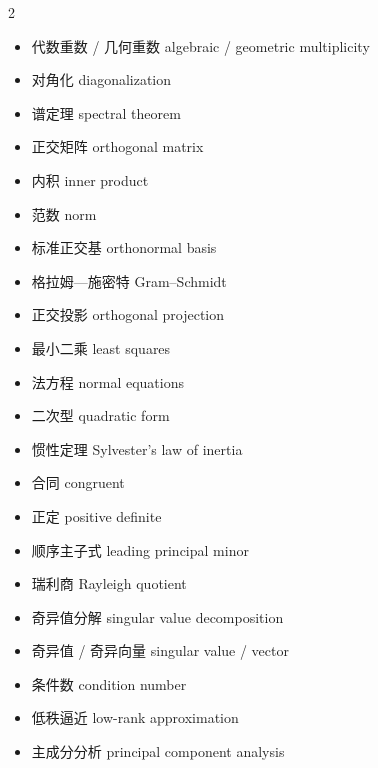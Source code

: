\documentclass[11pt,a4paper,openany]{ctexbook}
\begin{document}
\begin{multicols}{2}
\begin{itemize}[leftmargin=1.2em, itemsep=1.5pt, label={}]
\item 代数重数 / 几何重数 \hfill algebraic / geometric multiplicity
\item 对角化 \hfill diagonalization
\item 谱定理 \hfill spectral theorem
\item 正交矩阵 \hfill orthogonal matrix
\item 内积 \hfill inner product
\item 范数 \hfill norm
\item 标准正交基 \hfill orthonormal basis
\item 格拉姆—施密特 \hfill Gram--Schmidt
\item 正交投影 \hfill orthogonal projection
\item 最小二乘 \hfill least squares
\item 法方程 \hfill normal equations
\item 二次型 \hfill quadratic form
\item 惯性定理 \hfill Sylvester's law of inertia
\item 合同 \hfill congruent
\item 正定 \hfill positive definite
\item 顺序主子式 \hfill leading principal minor
\item 瑞利商 \hfill Rayleigh quotient
\item 奇异值分解 \hfill singular value decomposition
\item 奇异值 / 奇异向量 \hfill singular value / vector
\item 条件数 \hfill condition number
\item 低秩逼近 \hfill low-rank approximation
\item 主成分分析 \hfill principal component analysis
\end{itemize}
\end{multicols}

\end{document}

